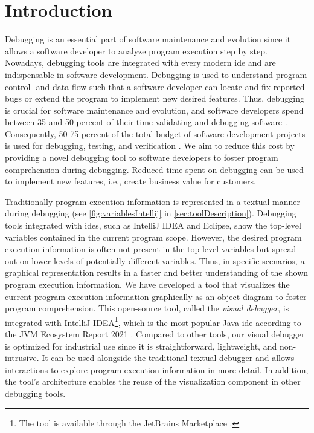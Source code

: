 \documentclass[conference]{IEEEtran}
\newcommand{\intellij}{IntelliJ IDEA}
\begin{document}
\section{Introduction}
Debugging is an essential part of software maintenance and evolution since it allows a software developer to analyze program execution step by step.
Nowadays, debugging tools are integrated with every modern \gls*{ide} and are indispensable in software development.
Debugging is used to understand program control- and data flow such that a software developer can locate and fix reported bugs or extend the program to implement new desired features.
Thus, debugging is crucial for software maintenance and evolution, and software developers spend between 35 and 50 percent of their time validating and debugging software \cite{odellDebuggingMindsetUnderstanding2017}.
Consequently, 50-75 percent of the total budget of software development projects is used for debugging, testing, and verification \cite{odellDebuggingMindsetUnderstanding2017}.
We aim to reduce this cost by providing a novel debugging tool to software developers to foster program comprehension during debugging.
Reduced time spent on debugging can be used to implement new features, i.e., create business value for customers.

Traditionally program execution information is represented in a textual manner during debugging (see \cref{fig:variablesIntellij} in \cref{sec:toolDescription}).
Debugging tools integrated with \glspl*{ide}, such as \intellij{} and Eclipse, show the top-level variables contained in the current program scope.
However, the desired program execution information is often not present in the top-level variables but spread out on lower levels of potentially different variables.
Thus, in specific scenarios, a graphical representation results in a faster and better understanding of the shown program execution information.
We have developed a tool that visualizes the current program execution information graphically as an object diagram to foster program comprehension.
This open-source tool, called the \textit{visual debugger}, is integrated with \intellij{}\footnote{The tool is available through the JetBrains Marketplace \cite{VisualDebuggerIntelliJ}.}, which is the most popular Java \gls*{ide} according to the JVM Ecosystem Report 2021 \cite{JVMEcosystemReport2021}.
Compared to other tools, our visual debugger is optimized for industrial use since it is straightforward, lightweight, and non-intrusive.
It can be used alongside the traditional textual debugger and allows interactions to explore program execution information in more detail.
In addition, the tool's architecture enables the reuse of the visualization component in other debugging tools.
\end{document}
